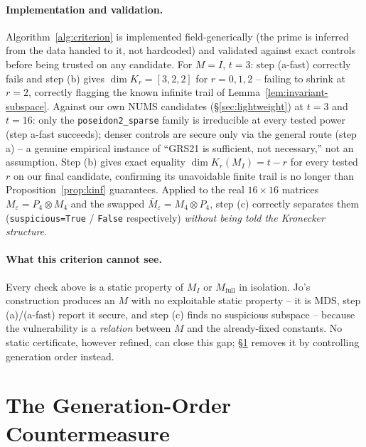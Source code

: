 \documentclass[conference]{IEEEtran}
\theoremstyle{definition}
\theoremstyle{plain}
\begin{document}
\paragraph{Implementation and validation.} Algorithm~\ref{alg:criterion}
is implemented field-generically (the prime is inferred from the data
handed to it, not hardcoded) and validated against exact controls before
being trusted on any candidate. For $M=I$, $t=3$: step (a-fast) correctly
fails and step (b) gives $\dim K_r=[3,2,2]$ for $r=0,1,2$ -- failing to
shrink at $r=2$, correctly flagging the known infinite trail of
Lemma~\ref{lem:invariant-subspace}. Against our own NUMS candidates
(\S\ref{sec:lightweight}) at $t=3$ and $t=16$: only the
\texttt{poseidon2\_sparse} family is irreducible at every tested power
(step a-fast succeeds); denser controls are secure only via the general
route (step a) -- a genuine empirical instance of ``GRS21 is sufficient,
not necessary,'' not an assumption. Step (b) gives exact equality
$\dim K_r(M_I)=t-r$ for every tested $r$ on our final candidate,
confirming its unavoidable finite trail is no longer than
Proposition~\ref{prop:kinf} guarantees. Applied to the real
$16\times16$ matrices $M_\varepsilon=P_4\otimes M_4$ and the swapped
$\bar M_\varepsilon=M_4\otimes P_4$, step (c) correctly separates them
(\texttt{suspicious=True} / \texttt{False} respectively) \emph{without
being told the Kronecker structure}.

\paragraph{What this criterion cannot see.} Every check above is a
static property of $M_I$ or $M_{\mathrm{full}}$ in isolation. Jo's
construction produces an $M$ with no exploitable static property --
it is MDS, step (a)/(a-fast) report it secure, and step (c) finds no
suspicious subspace -- because the vulnerability is a \emph{relation}
between $M$ and the already-fixed constants. No static certificate,
however refined, can close this gap; \S\ref{sec:countermeasure} removes
it by controlling generation order instead.

\section{The Generation-Order Countermeasure}
\label{sec:countermeasure}
\end{document}
